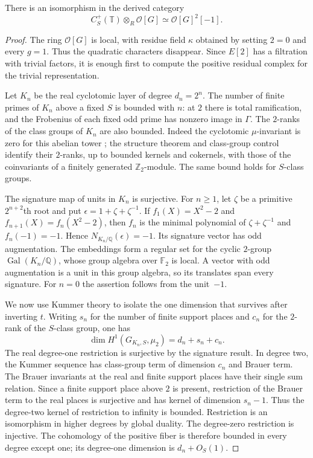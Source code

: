 \begin{lemma}\label{cy:residual}
There is an isomorphism in the derived category
\[
 C_S^+(\mathbb T)\otimes_R\mathcal O[G]
       \simeq \mathcal O[G]^2[-1].
\]
\end{lemma}
\begin{proof}
The ring $\mathcal O[G]$ is local, with residue field $\kappa$ obtained
by setting $2=0$ and every $g=1$.  Thus the quadratic characters disappear.
Since $E[2]$ has a filtration with trivial factors, it is enough first to
compute the positive residual complex for the trivial representation.

Let $K_n$ be the real cyclotomic layer of degree $d_n=2^n$.  The number
of finite primes of $K_n$ above a fixed $S$ is bounded with $n$: at $2$
there is total ramification, and the Frobenius of each fixed odd prime
has nonzero image in $\Gamma$.  The $2$-ranks of the class groups of
$K_n$ are also bounded.  Indeed the cyclotomic $\mu$-invariant is zero
for this abelian tower \cite{FerreroWashington1979}; the structure theorem
and class-group control identify their $2$-ranks, up to bounded kernels
and cokernels, with those of the coinvariants of a finitely generated
$\mathbb Z _2$-module.  The same bound holds for $S$-class groups.

The signature map of units in $K_n$ is surjective.  For $n\geq1$, let
$\zeta$ be a primitive $2^{n+2}$th root and put
$\epsilon=1+\zeta+\zeta^{-1}$.  If $f_1(X)=X^2-2$ and
$f_{n+1}(X)=f_n(X^2-2)$, then $f_n$ is the minimal polynomial of
$\zeta+\zeta^{-1}$ and $f_n(-1)=-1$.  Hence
$N_{K_n/\mathbb Q}(\epsilon)=-1$.  Its signature vector has odd
augmentation.  The embeddings form a regular set for the cyclic
$2$-group $\operatorname{Gal}(K_n/\mathbb Q)$, whose group algebra over
$\mathbb F _2$ is local.  A vector with odd augmentation is a unit in
this group algebra, so its translates span every signature.  For $n=0$
the assertion follows from the unit~$-1$.

We now use Kummer theory to isolate the one dimension that survives
after inverting $t$.
Writing $s_n$ for the number of finite support places and $c_n$ for the
$2$-rank of the $S$-class group, one has
\[
 \dim H^1(G_{K_n,S},\mu_2)=d_n+s_n+c_n.
\]
The real degree-one restriction is surjective by the signature result.
In degree two, the Kummer sequence has class-group term of dimension
$c_n$ and Brauer term.  The Brauer invariants at the real and finite
support places have their single sum relation.  Since a finite support
place above $2$ is present, restriction of the Brauer term to the real
places is surjective and has kernel of dimension $s_n-1$.  Thus the
degree-two kernel of restriction to infinity is bounded.  Restriction
is an isomorphism in higher degrees by global duality.  The degree-zero
restriction is injective.  The cohomology of the positive fiber is
therefore bounded in every degree except one; its degree-one dimension
is $d_n+O_S(1)$.


\end{proof}
